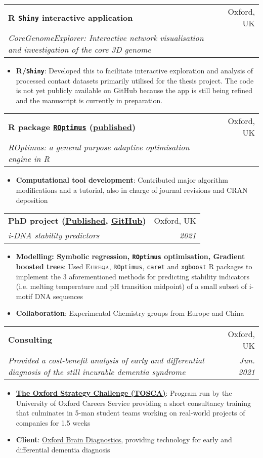 \documentclass[legalpaper,11pt]{article}
\makeatletter
\newcommand{\resumeItem}[2]{
  \item\small{
    \textbf{#1}{: #2 \vspace{-2pt}}
  }
}
\newcommand{\resumeSubheading}[4]{
  \vspace{-1pt}\item
    \begin{tabular*}{0.97\textwidth}[t]{l@{\extracolsep{\fill}}r}
      \textbf{#1} & #2 \\
      \textit{\small#3} & \textit{\small #4} \\
    \end{tabular*}\vspace{-5pt}
}
\newcommand{\resumeItemListStart}{\begin{itemize}}
\newcommand{\resumeItemListEnd}{\end{itemize}\vspace{-5pt}}
\makeatother
\begin{document}
     \resumeSubheading
      {R \texttt{Shiny} interactive application}{Oxford, UK}
      {CoreGenomeExplorer: Interactive network visualisation and investigation of the core 3D genome}{}
      \resumeItemListStart
        \resumeItem{R/\texttt{Shiny}}
          {Developed this to facilitate interactive exploration and analysis of processed contact datasets primarily utilised for the thesis project. The code is not yet publicly available on GitHub because the app is still being refined and the manuscript is currently in preparation.}
     \resumeItemListEnd

     \resumeSubheading
      {R package \href{https://cran.r-project.org/web/packages/ROptimus/index.html}{\texttt{ROptimus}} (\href{https://doi.org/10.1093/bioinformatics/btad292}{published})}{Oxford, UK}
      {ROptimus: a general purpose adaptive optimisation engine in R}{}
      \resumeItemListStart
        \resumeItem{Computational tool development}
          {Contributed major algorithm modifications and a tutorial, also in charge of journal revisions and CRAN deposition} %
     \resumeItemListEnd
     
     \resumeSubheading
      {PhD project (\href{https://doi.org/10.1002/anie.202016801}{Published}, \href{https://github.com/SahakyanLab/iMotif_dev}{GitHub})}{Oxford, UK}
      {i-DNA stability predictors}{2021}
      \resumeItemListStart
        \resumeItem{Modelling: Symbolic regression, \texttt{ROptimus} optimisation, Gradient boosted trees}
          {Used \textsc{Eureqa}, \texttt{ROptimus}, \texttt{caret} and \texttt{xgboost} R packages to implement the 3 aforementioned methods for predicting stability indicators (i.e. melting temperature and pH transition midpoint) of a small subset of i-motif DNA sequences}
          \resumeItem{Collaboration}{Experimental Chemistry groups from Europe and China}
     \resumeItemListEnd

     \resumeSubheading
      {Consulting}{Oxford, UK}
      {Provided a cost-benefit analysis of early and differential diagnosis of the still incurable dementia syndrome}{Jun. 2021}
      \resumeItemListStart
        \resumeItem{\href{https://www.careers.ox.ac.uk/oxford-strategy-challenge}{The Oxford Strategy Challenge (TOSCA)}}
          {Program run by the University of Oxford Careers Service providing a short consultancy training that culminates in 5-man student teams working on real-world projects of companies for 1.5 weeks}
        \resumeItem{Client}
          {\href{https://www.oxfordbraindiagnostics.com/}{Oxford Brain Diagnostics}, providing technology for early and differential dementia diagnosis}
      \resumeItemListEnd
     
\end{document}
